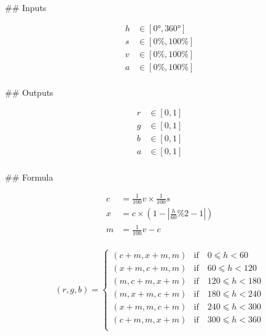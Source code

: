 ## Inputs

$$\begin{aligned}
h &∈ [0°, 360°]\\
s &∈ [0\%, 100\%]\\
v &∈ [0\%, 100\%]\\
a &∈ [0\%, 100\%]\\
\end{aligned}$$

## Outputs

$$\begin{aligned}
r &∈ [0, 1]\\
g &∈ [0, 1]\\
b &∈ [0, 1]\\
a &∈ [0, 1]\\
\end{aligned}$$

## Formula


$$\begin{aligned}
c &= \frac{1}{100}v × \frac{1}{100}s\\
x &= c × \left(1 - \left|\frac{h}{60} \% 2 - 1\right|\right)\\
m &= \frac{1}{100}v - c \\
\end{aligned}$$

$$ (r, g, b) = \begin{cases}
(c + m, x + m, m) & \text{if}\quad 0 ⩽ h < 60 \\
(x + m, c + m, m) & \text{if}\quad 60 ⩽ h < 120 \\
(m, c + m, x + m) & \text{if}\quad 120 ⩽ h < 180 \\
(m, x + m, c + m) & \text{if}\quad 180 ⩽ h < 240 \\
(x + m, m, c + m) & \text{if}\quad 240 ⩽ h < 300 \\
(c + m, m, x + m) & \text{if}\quad 300 ⩽ h < 360 \\
\end{cases} $$